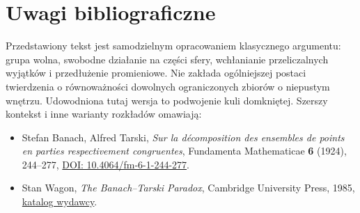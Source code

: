 \section*{Uwagi bibliograficzne}
Przedstawiony tekst jest samodzielnym opracowaniem klasycznego argumentu: grupa wolna, swobodne działanie na części sfery, wchłanianie przeliczalnych wyjątków i przedłużenie promieniowe. Nie zakłada ogólniejszej postaci twierdzenia o równoważności dowolnych ograniczonych zbiorów o niepustym wnętrzu. Udowodniona tutaj wersja to podwojenie kuli domkniętej. Szerszy kontekst i inne warianty rozkładów omawiają:
\begin{itemize}
\item Stefan Banach, Alfred Tarski, \emph{Sur la décomposition des ensembles de points en parties respectivement congruentes}, Fundamenta Mathematicae \textbf{6} (1924), 244--277, \href{https://doi.org/10.4064/fm-6-1-244-277}{DOI: 10.4064/fm-6-1-244-277}.
\item Stan Wagon, \emph{The Banach--Tarski Paradox}, Cambridge University Press, 1985, \href{https://www.cambridge.org/core/books/the-banach-tarski-paradox/EA35091E69D798AE0FAE5A4E8386DD08}{katalog wydawcy}.
\end{itemize}
